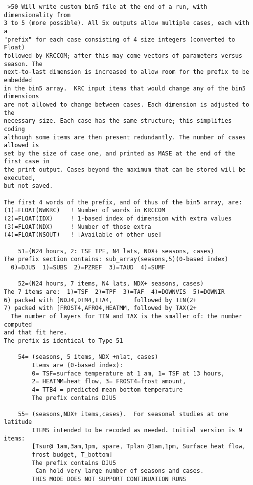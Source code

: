 \begin{verbatim}
 >50 Will write custom bin5 file at the end of a run, with dimensionality from
3 to 5 (more possible). All 5x outputs allow multiple cases, each with a
"prefix" for each case consisting of 4 size integers (converted to Float)
followed by KRCCOM; after this may come vectors of parameters versus season. The
next-to-last dimension is increased to allow room for the prefix to be embedded
in the bin5 array.  KRC input items that would change any of the bin5 dimensions
are not allowed to change between cases. Each dimension is adjusted to the
necessary size. Each case has the same structure; this simplifies coding
although some items are then present redundantly. The number of cases allowed is
set by the size of case one, and printed as MASE at the end of the first case in
the print output. Cases beyond the maximum that can be stored will be executed,
but not saved.

The first 4 words of the prefix, and of thus of the bin5 array, are:
(1)=FLOAT(NWKRC)   ! Number of words in KRCCOM
(2)=FLOAT(IDX)     ! 1-based index of dimension with extra values
(3)=FLOAT(NDX)     ! Number of those extra
(4)=FLOAT(NSOUT)   ! [Available of other use]

    51=(N24 hours, 2: TSF TPF, N4 lats, NDX+ seasons, cases)
The prefix section contains: sub_array(seasons,5)(0-based index)
  0)=DJU5  1)=SUBS  2)=PZREF  3)=TAUD  4)=SUMF

    52=(N24 hours, 7 items, N4 lats, NDX+ seasons, cases)
The 7 items are:  1)=TSF  2)=TPF  3)=TAF  4)=DOWNVIS  5)=DOWNIR
6) packed with [NDJ4,DTM4,TTA4,      followed by TIN(2+
7) packed with [FROST4,AFRO4,HEATMM, followed by TAX(2+
  The number of layers for TIN and TAX is the smaller of: the number computed 
and that fit here.
The prefix is identical to Type 51

    54= (seasons, 5 items, NDX +nlat, cases)
        Items are (0-based index): 
        0= TSF=surface temperature at 1 am, 1= TSF at 13 hours,
        2= HEATMM=heat flow, 3= FROST4=frost amount, 
        4= TTB4 = predicted mean bottom temperature
        The prefix contains DJU5 

    55= (seasons,NDX+ items,cases).  For seasonal studies at one latitude
        ITEMS intended to be recoded as needed. Initial version is 9 items:
        [Tsur@ 1am,3am,1pm, spare, Tplan @1am,1pm, Surface heat flow,
        frost budget, T_bottom]
        The prefix contains DJU5        
         Can hold very large number of seasons and cases. 
        THIS MODE DOES NOT SUPPORT CONTINUATION RUNS


\end{verbatim}
